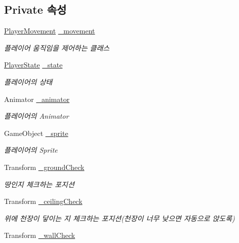 \subsection*{Private 속성}
\begin{DoxyCompactItemize}
\item 
\mbox{\hyperlink{class_player_movement}{Player\+Movement}} \mbox{\hyperlink{class_player_controller_ad788cfe2e37318d22d52010dc0fecd57}{\+\_\+movement}}
\begin{DoxyCompactList}\small\item\em 플레이어 움직임을 제어하는 클래스 \end{DoxyCompactList}\item 
\mbox{\hyperlink{class_player_state}{Player\+State}} \mbox{\hyperlink{class_player_controller_addcd33a9c23c1b949964365390c7a6eb}{\+\_\+state}}
\begin{DoxyCompactList}\small\item\em 플레이어의 상태 \end{DoxyCompactList}\item 
Animator \mbox{\hyperlink{class_player_controller_ada29d77d333483963257e51a6e15b8ae}{\+\_\+animator}}
\begin{DoxyCompactList}\small\item\em 플레이어의 Animator \end{DoxyCompactList}\item 
Game\+Object \mbox{\hyperlink{class_player_controller_aeb0b2dc2ef34062f72afaf20899ce307}{\+\_\+sprite}}
\begin{DoxyCompactList}\small\item\em 플레이어의 Sprite \end{DoxyCompactList}\item 
Transform \mbox{\hyperlink{class_player_controller_ae4940f9e37dd5bf49788de933a833377}{\+\_\+ground\+Check}}
\begin{DoxyCompactList}\small\item\em 땅인지 체크하는 포지션 \end{DoxyCompactList}\item 
Transform \mbox{\hyperlink{class_player_controller_a932dbf6c5cc4527856596dc1f9df1426}{\+\_\+ceiling\+Check}}
\begin{DoxyCompactList}\small\item\em 위에 천장이 닿이는 지 체크하는 포지션(천장이 너무 낮으면 자동으로 앉도록) \end{DoxyCompactList}\item 
Transform \mbox{\hyperlink{class_player_controller_a0f614194c904fe2b4e6d81dc0ec96da2}{\+\_\+wall\+Check}}

\end{DoxyCompactItemize}
